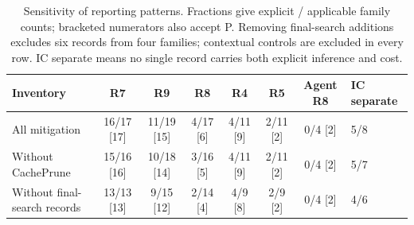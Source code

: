 \begin{table}[t]\centering\footnotesize
\caption{Sensitivity of reporting patterns. Fractions give explicit / applicable family counts; bracketed numerators also accept P. Removing final-search additions excludes six records from four families; contextual controls are excluded in every row. IC separate means no single record carries both explicit inference and cost.}\label{tab:r34-removal}
\begin{tabularx}{\textwidth}{@{}Yccccccl@{}}\toprule
Inventory & R7 & R9 & R8 & R4 & R5 & Agent R8 & IC separate\\\midrule
All mitigation & 16/17 [17] & 11/19 [15] & 4/17 [6] & 4/11 [9] & 2/11 [2] & 0/4 [2] & 5/8\\
Without CachePrune & 15/16 [16] & 10/18 [14] & 3/16 [5] & 4/11 [9] & 2/11 [2] & 0/4 [2] & 5/7\\
Without final-search records & 13/13 [13] & 9/15 [12] & 2/14 [4] & 4/9 [8] & 2/9 [2] & 0/4 [2] & 4/6\\
\bottomrule\end{tabularx}\end{table}
